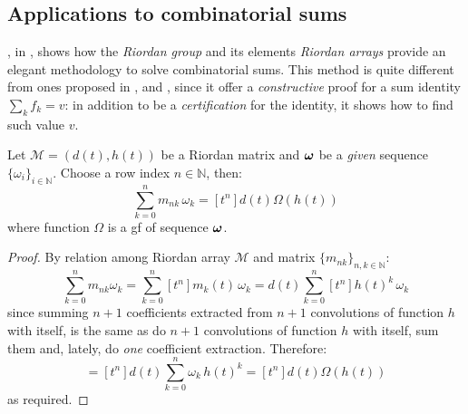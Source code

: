 

\subsection{Applications to combinatorial sums}

\citeauthor{sprugnoli:1991}, in \cite{sprugnoli:1991}, shows how the
\emph{Riordan group} and its elements \emph{Riordan arrays} provide an elegant
methodology to solve combinatorial sums. This method is quite different from
ones proposed in \cite{egorychev:1990}, \cite{wilf:zeilberger:1990} and
\cite{wilf:1989}, since it offer a \emph{constructive} proof for a sum identity
$\sum_{k}f_{k}=v$: 
in addition to be a \emph{certification} for the identity, it shows how to find
such value $v$. 

\begin{theorem}[Sprugnoli]
    Let $\mathcal{M}=(d(t),h(t))$ be a Riordan matrix and $\boldsymbol{\omega}$ 
    be a \emph{given} sequence $\lbrace\omega_{i}\rbrace_{i\in\mathbb{N}}$. Choose
    a row index $n\in\mathbb{N}$, then:
    \begin{displaymath}
        \sum_{k=0}^{n}{m_{nk}\,\omega_{k}}=[t^{n}]d(t)\Omega(h(t))
    \end{displaymath}
    where function $\Omega$ is a \ac{gf} of sequence $\boldsymbol{\omega}$.
    \label{thm:sprugnoli:riordan:combinatorial:sums}
\end{theorem}

\begin{proof}
    By relation among Riordan array $\mathcal{M}$ and matrix 
    $\lbrace m_{nk}\rbrace_{n,k\in\mathbb{N}}$:
    \begin{displaymath}
        \sum_{k=0}^{n}{m_{nk}\omega_{k}}
            =\sum_{k=0}^{n}{[t^{n}]m_{k}(t)\,\omega_{k}}
            =d(t)\sum_{k=0}^{n}{[t^{n}]h(t)^{k}\,\omega_{k}}
    \end{displaymath}
    since summing $n+1$ coefficients extracted from $n+1$
    convolutions of function $h$ with itself, is the same as
    do $n+1$ convolutions of function $h$ with itself, sum them
    and, lately, do \emph{one} coefficient extraction. Therefore:
    \begin{displaymath}
        =[t^{n}]d(t)\sum_{k=0}^{n}{\omega_{k}\,h(t)^{k}}
        =[t^{n}]d(t)\Omega(h(t))
    \end{displaymath}
    as required.
\end{proof}

